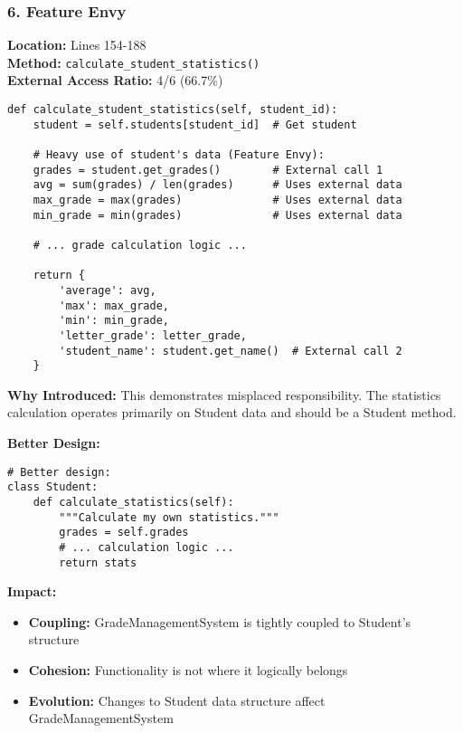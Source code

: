 \documentclass[11pt,a4paper]{article}
\begin{document}
\subsubsection{6. Feature Envy}

\textbf{Location:} Lines 154-188 \\
\textbf{Method:} \texttt{calculate\_student\_statistics()} \\
\textbf{External Access Ratio:} 4/6 (66.7\%)

\begin{lstlisting}[caption={Feature Envy Example}]
def calculate_student_statistics(self, student_id):
    student = self.students[student_id]  # Get student
    
    # Heavy use of student's data (Feature Envy):
    grades = student.get_grades()        # External call 1
    avg = sum(grades) / len(grades)      # Uses external data
    max_grade = max(grades)              # Uses external data
    min_grade = min(grades)              # Uses external data
    
    # ... grade calculation logic ...
    
    return {
        'average': avg,
        'max': max_grade,
        'min': min_grade,
        'letter_grade': letter_grade,
        'student_name': student.get_name()  # External call 2
    }
\end{lstlisting}

\textbf{Why Introduced:} This demonstrates misplaced responsibility. The statistics calculation operates primarily on Student data and should be a Student method.

\textbf{Better Design:}
\begin{lstlisting}[caption={Improved Design}]
# Better design:
class Student:
    def calculate_statistics(self):
        """Calculate my own statistics."""
        grades = self.grades
        # ... calculation logic ...
        return stats
\end{lstlisting}

\textbf{Impact:}
\begin{itemize}[noitemsep]
    \item \textbf{Coupling:} GradeManagementSystem is tightly coupled to Student's structure
    \item \textbf{Cohesion:} Functionality is not where it logically belongs
    \item \textbf{Evolution:} Changes to Student data structure affect GradeManagementSystem
\end{itemize}
\end{document}
